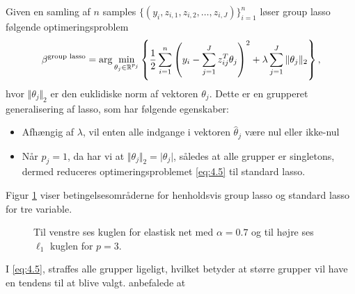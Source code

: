 Given en samling af $n$ samples \(\{(y_i, z_{i,1}, z_{i,2}, \ldots, z_{i,J})\}_{i=1}^n\) løser group lasso følgende optimeringsproblem
\begin{align}
\beta^{\text{group lasso}} = \arg \min_{\theta_j \in \R^{p_j}} \cbr{\frac{1}{2} \sum_{i=1}^n \del{y_i - \sum_{j=1}^J z_{ij}^T \theta_j}^2 + \lambda \sum_{j=1}^J \Vert \theta_j \Vert_2},\label{eq:4.5}
\end{align}
hvor $\Vert \theta_j \Vert_2$ er den euklidiske norm af vektoren $\theta_j$.
Dette er en grupperet generalisering af lasso, som har følgende egenskaber:
\begin{itemize}
\item Afhængig af $\lambda$, vil enten alle indgange i vektoren $\hat{\theta}_j$ være nul eller ikke-nul
\item Når $p_j=1$, da har vi at $\Vert \theta_j \Vert_2 = \vert \theta_j \vert$, således at alle grupper er singletons, dermed reduceres optimeringsproblemet \eqref{eq:4.5} til standard lasso.
\end{itemize}
Figur \ref{fig:elastisk_net} viser betingelsesområderne for henholdsvis group lasso og standard lasso for tre variable.
%
\begin{figure}[H]
\centering
\caption{Til venstre ses kuglen for elastisk net med \(\alpha=0.7\) og til højre ses \(\ell_1\) kuglen for \(p=3\).}
\label{fig:elastisk_net}
\end{figure}
%
I \eqref{eq:4.5}, straffes alle grupper ligeligt, hvilket betyder at større grupper vil have en tendens til at blive valgt.
\citep{group_lasso} anbefalede at 

